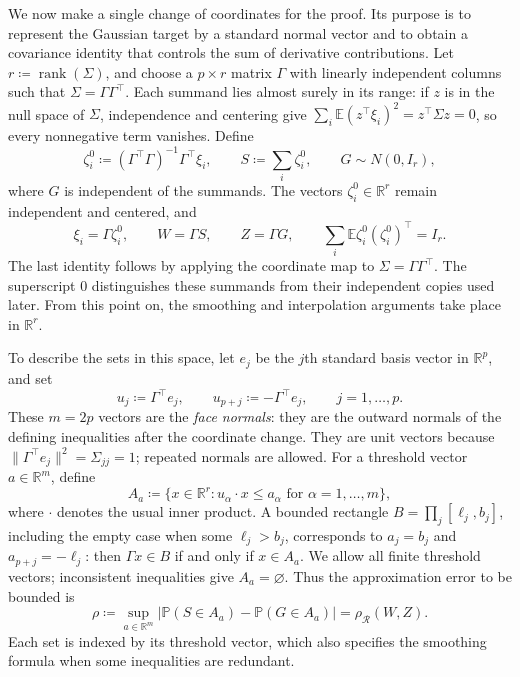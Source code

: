 \documentclass[11pt,letterpaper]{article}
\theoremstyle{remark}
\newcommand{\E}{\mathbb E}
\newcommand{\Pp}{\mathbb P}
\newcommand{\R}{\mathbb R}
\newcommand{\rh}{\rho_{\mathcal R}}
\begin{document}
We now make a single change of coordinates for the proof. Its purpose
is to represent the Gaussian target by a standard normal vector and
to obtain a covariance identity that controls the sum of derivative
contributions. Let \(r\coloneqq\operatorname{rank}(\Sigma)\), and
choose a \(p\times r\) matrix \(\Gamma\) with linearly independent
columns such that \(\Sigma=\Gamma\Gamma^\top\). Each summand lies
almost surely in its range: if \(z\) is in the null space of
\(\Sigma\), independence and centering give
\(\sum_i\E(z^\top\xi_i)^2=z^\top\Sigma z=0\), so every
nonnegative term vanishes. Define
\[
 \zeta_i^0\coloneqq(\Gamma^\top\Gamma)^{-1}\Gamma^\top\xi_i,
 \qquad S\coloneqq\sum_i\zeta_i^0,
 \qquad G\sim N(0,I_r),
\]
where \(G\) is independent of the summands. The vectors
\(\zeta_i^0\in\R^r\) remain independent and centered, and
\[
 \xi_i=\Gamma\zeta_i^0,\qquad
 W=\Gamma S,\qquad Z=\Gamma G,\qquad
 \sum_i\E\zeta_i^0(\zeta_i^0)^\top=I_r.
\]
The last identity follows by applying the coordinate map to
\(\Sigma=\Gamma\Gamma^\top\). The superscript \(0\) distinguishes
these summands from their independent copies used later. From this
point on, the smoothing and interpolation arguments take place in
\(\R^r\).

To describe the sets in this space, let \(e_j\) be the \(j\)th
standard basis vector in \(\R^p\), and set
\[
 u_j\coloneqq\Gamma^\top e_j,\qquad
 u_{p+j}\coloneqq-\Gamma^\top e_j,
 \qquad j=1,\ldots,p.
\]
These \(m=2p\) vectors are the \emph{face normals}: they are the
outward normals of the defining inequalities after the coordinate
change. They are unit vectors because
\(\|\Gamma^\top e_j\|^2=\Sigma_{jj}=1\); repeated normals are
allowed. For a threshold vector \(a\in\R^m\), define
\[
 A_a\coloneqq\{x\in\R^r:u_\alpha\cdot x\le a_\alpha
                       \text{ for }\alpha=1,\ldots,m\},
\]
where \(\cdot\) denotes the usual inner product. A bounded rectangle
\(B=\prod_j[\ell_j,b_j]\), including the empty case when some
\(\ell_j>b_j\), corresponds to
\(a_j=b_j\) and \(a_{p+j}=-\ell_j\): then
\(\Gamma x\in B\) if and only if \(x\in A_a\). We allow all
finite threshold vectors; inconsistent inequalities give
\(A_a=\varnothing\). Thus the approximation error to be bounded is
\[
 \rho\coloneqq\sup_{a\in\R^m}
 |\Pp(S\in A_a)-\Pp(G\in A_a)|=\rh(W,Z).
\]
Each set is indexed by its threshold vector, which also specifies
the smoothing formula when some inequalities are redundant.
\end{document}
